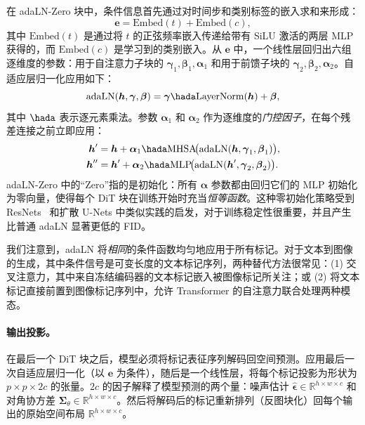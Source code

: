 \documentclass[../../book-main_zh.tex]{subfiles}
\begin{document}
在 adaLN-Zero 块中，条件信息首先通过对时间步和类别标签的嵌入求和来形成：
\begin{equation}
    \boldsymbol{e} = \mathrm{Embed}(t) + \mathrm{Embed}(c),
\end{equation}
其中 $\mathrm{Embed}(t)$ 是通过将 $t$ 的正弦频率嵌入传递给带有 SiLU 激活的两层 MLP 获得的，而 $\mathrm{Embed}(c)$ 是学习到的类别嵌入。从 $\boldsymbol{e}$ 中，一个线性层回归出六组逐维度的参数：用于自注意力子块的 $\boldsymbol{\gamma}_1, \boldsymbol{\beta}_1, \boldsymbol{\alpha}_1$ 和用于前馈子块的 $\boldsymbol{\gamma}_2, \boldsymbol{\beta}_2, \boldsymbol{\alpha}_2$。自适应层归一化应用如下：
\begin{equation}
    \mathrm{adaLN}(\boldsymbol{h}, \boldsymbol{\gamma}, \boldsymbol{\beta}) = \boldsymbol{\gamma} \hada \mathrm{LayerNorm}(\boldsymbol{h}) + \boldsymbol{\beta},
\end{equation}
其中 $\hada$ 表示逐元素乘法。参数 $\boldsymbol{\alpha}_1$ 和 $\boldsymbol{\alpha}_2$ 作为逐维度的\emph{门控因子}，在每个残差连接之前立即应用：
\begin{equation}
\begin{aligned}
    \boldsymbol{h}' &= \boldsymbol{h} + \boldsymbol{\alpha}_1 \hada \mathrm{MHSA}\!\big(\mathrm{adaLN}(\boldsymbol{h}, \boldsymbol{\gamma}_1, \boldsymbol{\beta}_1)\big), \\
    \boldsymbol{h}'' &= \boldsymbol{h}' + \boldsymbol{\alpha}_2 \hada \mathrm{MLP}\!\big(\mathrm{adaLN}(\boldsymbol{h}', \boldsymbol{\gamma}_2, \boldsymbol{\beta}_2)\big).
\end{aligned}
\end{equation}
adaLN-Zero 中的“Zero”指的是初始化：所有 $\boldsymbol{\alpha}$ 参数都由回归它们的 MLP 初始化为零向量，使得每个 DiT 块在训练开始时充当\emph{恒等函数}。这种零初始化策略受到 ResNets~\citep{goyal2017accurate} 和扩散 U-Nets 中类似实践的启发，对于训练稳定性很重要，并且产生比普通 adaLN 显著更低的 FID。

我们注意到，adaLN 将\emph{相同}的条件函数均匀地应用于所有标记。对于文本到图像的生成，其中条件信号是可变长度的文本标记序列，两种替代方法很常见：(1) 交叉注意力，其中来自冻结编码器的文本标记嵌入被图像标记所关注；或 (2) 将文本标记直接前置到图像标记序列中，允许 Transformer 的自注意力联合处理两种模态。

\paragraph{输出投影。}
在最后一个 DiT 块之后，模型必须将标记表征序列解码回空间预测。应用最后一次自适应层归一化（以 $\boldsymbol{e}$ 为条件），随后是一个线性层，将每个标记投影为形状为 $p \times p \times 2c$ 的张量。$2c$ 的因子解释了模型预测的两个量：噪声估计 $\hat{\boldsymbol{\epsilon}} \in \mathbb{R}^{h \times w \times c}$ 和对角协方差 $\boldsymbol{\Sigma}_\theta \in \mathbb{R}^{h \times w \times c}$。然后将解码后的标记重新排列（反图块化）回每个输出的原始空间布局 $\mathbb{R}^{h \times w \times c}$。
\end{document}
